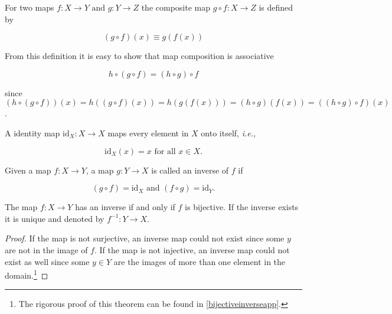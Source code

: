 \documentclass[a4paper,12pt]{report}
\begin{document}
\begin{definition}
For two maps \(f:X \rightarrow Y \text { and } g: Y \rightarrow Z\) the composite map  \(g \circ f: X \rightarrow Z\) is defined by

\begin{equation}
    (g \circ f)(x) \equiv g(f(x))
\end{equation}

\end{definition}

From this definition it is easy to show that map composition is associative

\begin{equation}
    h \circ (g \circ  f) = (h \circ  g) \circ f
\end{equation}

since \((h \circ (g \circ f))(x) = h((g \circ f)(x)) = h(g(f(x))) = (h \circ g)(f(x)) = ((h \circ g) \circ f)(x)\).

\begin{definition}
A identity map \(\mathrm{id}_{X} : X \rightarrow X\)  maps every element in \(X\) onto itself, \textit{i.e.,} 

\begin{equation}
    \mathrm{id}_{X} (x) = x \text{ for all } x \in  X.
\end{equation}
\end{definition}

\begin{definition}
Given a map \(f: X \rightarrow Y\), a map \(g: Y \rightarrow X\) is called an inverse of \(f\) if

\begin{equation}
    (g \circ  f) = \mathrm{id}_{X} \text { and } (f \circ g) = \mathrm{id}_{Y}. 
\end{equation}

\end{definition}

\begin{theorem} \label{bijectiveinverse} 
The map \(f: X \rightarrow Y\) has an inverse if and only if \(f\) is bijective. If the inverse exists it is unique and denoted by \(f^{-1} : Y \rightarrow X\). 
\end{theorem}

\begin{proof}
    If the map is not surjective, an inverse map could not exist since some \(y\) are not in the image of \(f\). If the map is not injective, an inverse map could not exist as well since some \(y \in  Y\) are the images of more than one element in the domain.\footnote{The rigorous proof of this theorem can be found in \cref{bijectiveinverseapp}.}
\end{proof}
\end{document}
